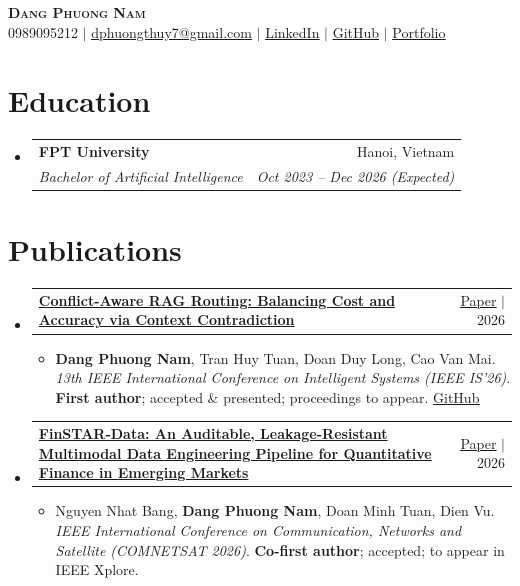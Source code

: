 \documentclass[letterpaper,11pt]{article}
\makeatletter
\newcommand{\resumeItem}[1]{\item\small{{#1 \vspace{-2pt}}}}
\newcommand{\resumeSubheading}[4]{
  \vspace{-2pt}\item
    \begin{tabular*}{0.97\textwidth}[t]{l@{\extracolsep{\fill}}r}
      \textbf{#1} & #2 \\
      \textit{\small#3} & \textit{\small #4} \\
    \end{tabular*}\vspace{-7pt}
}
\newcommand{\resumePubHeading}[2]{
    \item
    \begin{tabular*}{0.97\textwidth}{p{0.84\textwidth}@{\extracolsep{\fill}}r}
      \small\textbf{#1} & #2 \\
    \end{tabular*}\vspace{-7pt}
}
\newcommand{\resumeSubHeadingListStart}{\begin{itemize}[leftmargin=0.15in, label={}]}
\newcommand{\resumeSubHeadingListEnd}{\end{itemize}}
\newcommand{\resumeItemListStart}{\begin{itemize}}
\newcommand{\resumeItemListEnd}{\end{itemize}\vspace{-5pt}}
\makeatother
\begin{document}
\begin{center}
    \textbf{\Huge \scshape Dang Phuong Nam} \\ \vspace{1pt}
    \small 0989095212 $|$ \href{mailto:dphuongthuy7@gmail.com}{\underline{dphuongthuy7@gmail.com}} $|$
    \href{https://www.linkedin.com/in/phuongnam-dang/}{\underline{LinkedIn}} $|$
    \href{https://github.com/zafkielzz}{\underline{GitHub}} $|$
    \href{https://zafkiel-portfolio.vercel.app/}{\underline{Portfolio}}
\end{center}

\section{Education}
  \resumeSubHeadingListStart
    \resumeSubheading
      {FPT University}{Hanoi, Vietnam}
      {Bachelor of Artificial Intelligence}{Oct 2023 -- Dec 2026 (Expected)}
  \resumeSubHeadingListEnd

\section{Publications}
  \resumeSubHeadingListStart
    \resumePubHeading
      {\href{https://zafkiel-portfolio.vercel.app/paper_93.pdf}{Conflict-Aware RAG Routing: Balancing Cost and Accuracy via Context Contradiction}}{\href{https://zafkiel-portfolio.vercel.app/paper_93.pdf}{\underline{Paper}} $|$ 2026}
      \resumeItemListStart
        \resumeItem{\textbf{Dang Phuong Nam}, Tran Huy Tuan, Doan Duy Long, Cao Van Mai. \textit{13th IEEE International Conference on Intelligent Systems (IEEE IS'26)}. \textbf{First author}; accepted \& presented; proceedings to appear. \href{https://github.com/RAG-Routing-Via-Context-Confliction/RAG_Router_Via_Context_Conflict}{\underline{GitHub}}}
      \resumeItemListEnd
    \resumePubHeading
      {\href{https://zafkiel-portfolio.vercel.app/comnetsat_2026_finstar_data.pdf}{FinSTAR-Data: An Auditable, Leakage-Resistant Multimodal Data Engineering Pipeline for Quantitative Finance in Emerging Markets}}{\href{https://zafkiel-portfolio.vercel.app/comnetsat_2026_finstar_data.pdf}{\underline{Paper}} $|$ 2026}
      \resumeItemListStart
        \resumeItem{Nguyen Nhat Bang, \textbf{Dang Phuong Nam}, Doan Minh Tuan, Dien Vu. \textit{IEEE International Conference on Communication, Networks and Satellite (COMNETSAT 2026)}. \textbf{Co-first author}; accepted; to appear in IEEE Xplore.}
      \resumeItemListEnd
  \resumeSubHeadingListEnd
\end{document}
